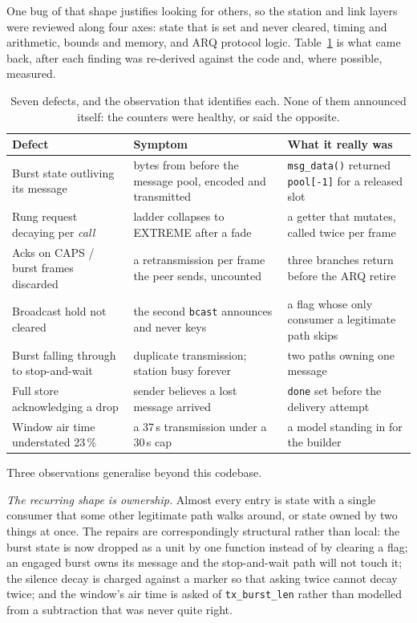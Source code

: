 One bug of that shape justifies looking for others, so the station and
link layers were reviewed along four axes: state that is set and never
cleared, timing and arithmetic, bounds and memory, and ARQ protocol
logic.  Table~\ref{tab:review} is what came back, after each finding was
re-derived against the code and, where possible, measured.

\begin{table}[H]
    \centering
    \caption{Seven defects, and the observation that identifies each.
             None of them announced itself: the counters were healthy,
             or said the opposite.}
    \label{tab:review}
    \small
    \begin{tabular}{@{}p{4.5cm}p{4.3cm}p{4.6cm}@{}}
    \toprule
    \textbf{Defect} & \textbf{Symptom} & \textbf{What it really was} \\
    \midrule
    Burst state outliving its message &
    bytes from before the message pool, encoded and transmitted &
    \texttt{msg\_data()} returned \texttt{pool[-1]} for a released slot \\
    Rung request decaying per \emph{call} &
    ladder collapses to EXTREME after a fade &
    a getter that mutates, called twice per frame \\
    Acks on CAPS / burst frames discarded &
    a retransmission per frame the peer sends, uncounted &
    three branches return before the ARQ retire \\
    Broadcast hold not cleared &
    the second \texttt{bcast} announces and never keys &
    a flag whose only consumer a legitimate path skips \\
    Burst falling through to stop-and-wait &
    duplicate transmission; station busy forever &
    two paths owning one message \\
    Full store acknowledging a drop &
    sender believes a lost message arrived &
    \texttt{done} set before the delivery attempt \\
    Window air time understated 23\,\% &
    a 37\,s transmission under a 30\,s cap &
    a model standing in for the builder \\
    \bottomrule
    \end{tabular}
\end{table}

Three observations generalise beyond this codebase.

\emph{The recurring shape is ownership.}  Almost every entry is state
with a single consumer that some other legitimate path walks around, or
state owned by two things at once.  The repairs are correspondingly
structural rather than local: the burst state is now dropped as a unit
by one function instead of by clearing a flag; an engaged burst owns its
message and the stop-and-wait path will not touch it; the
silence decay is charged against a marker so that asking twice cannot
decay twice; and the window's air time is asked of
\texttt{tx\_burst\_len} rather than modelled from a subtraction that was
never quite right.

